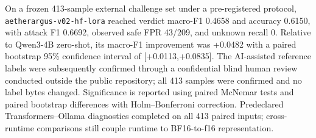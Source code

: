 On a frozen 413-sample external challenge set under a pre-registered protocol,
\texttt{aetherargus-v02-hf-lora} reached verdict macro-F1 0.4658 and accuracy
0.6150, with attack F1 0.6692, observed safe FPR 43/209, and unknown recall 0.
Relative to Qwen3-4B zero-shot, its macro-F1 improvement was +0.0482 with a paired
bootstrap 95\% confidence interval of [+0.0113,+0.0835]. The AI-assisted reference
labels were subsequently confirmed through a confidential blind human review conducted
outside the public repository; all 413 samples were confirmed and no label bytes changed.
Significance is reported using paired McNemar tests and paired bootstrap differences with
Holm--Bonferroni correction. Predeclared Transformers--Ollama diagnostics completed on all
413 paired inputs; cross-runtime comparisons still couple runtime to BF16-to-f16
representation.
